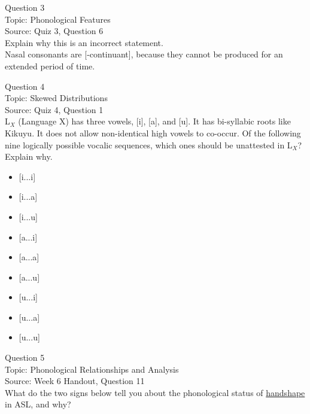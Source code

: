 \documentclass[12pt]{article}
\begin{document}
\newpage

{\large Question 3}\\

Topic: Phonological Features\\
Source: Quiz 3, Question 6\\

Explain why this is an incorrect statement.\\

Nasal consonants are {[-continuant]}, because they cannot be produced for an extended period of time.


\newpage

{\large Question 4}\\

Topic: Skewed Distributions\\
Source: Quiz 4, Question 1\\

L$_X$ (Language X) has three vowels, [i], [a], and [u]. It has bi-syllabic roots like Kikuyu. It does not allow non-identical high vowels to co-occur. Of the following nine logically possible vocalic sequences, which ones should be unattested in L$_X$? Explain why.\\

\begin{itemize} \item {[i...i]} \item {[i...a]} \item {[i...u]} \item {[a...i]} \item {[a...a]} \item {[a...u]} \item {[u...i]} \item {[u...a]} \item {[u...u]} \end{itemize}


\newpage

{\large Question 5}\\

Topic: Phonological Relationships and Analysis\\
Source: Week 6 Handout, Question 11\\

What do the two signs below tell you about the phonological status of \underline{handshape} in ASL, and why?\\
\end{document}
